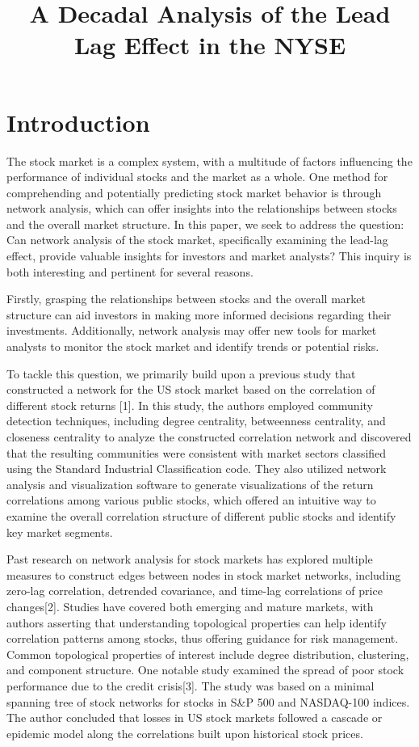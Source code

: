 \documentclass{article}
\title{A Decadal Analysis of the Lead Lag Effect in the NYSE}
\begin{document}
\maketitle




\section{Introduction}



The stock market is a complex system, with a multitude of factors influencing the performance of individual stocks and the market as a whole. One method for comprehending and potentially predicting stock market behavior is through network analysis, which can offer insights into the relationships between stocks and the overall market structure. In this paper, we seek to address the question: Can network analysis of the stock market, specifically examining the lead-lag effect, provide valuable insights for investors and market analysts? This inquiry is both interesting and pertinent for several reasons.

Firstly, grasping the relationships between stocks and the overall market structure can aid investors in making more informed decisions regarding their investments. Additionally, network analysis may offer new tools for market analysts to monitor the stock market and identify trends or potential risks.

To tackle this question, we primarily build upon a previous study that constructed a network for the US stock market based on the correlation of different stock returns [1]. In this study, the authors employed community detection techniques, including degree centrality, betweenness centrality, and closeness centrality to analyze the constructed correlation network and discovered that the resulting communities were consistent with market sectors classified using the Standard Industrial Classification  code. They also utilized network analysis and visualization software to generate visualizations of the return correlations among various public stocks, which offered an intuitive way to examine the overall correlation structure of different public stocks and identify key market segments.

Past research on network analysis for stock markets has explored multiple measures to construct edges between nodes in stock market networks, including zero-lag correlation, detrended covariance, and time-lag correlations of price changes[2].  Studies have covered both emerging and mature markets, with authors asserting that understanding topological properties can help identify correlation patterns among stocks, thus offering guidance for risk management. Common topological properties of interest include degree distribution, clustering, and component structure. One notable study examined the spread of poor stock performance due to the credit crisis[3]. The study was based on a minimal spanning tree of stock networks for stocks in S\&P 500 and NASDAQ-100 indices. The author concluded that losses in US stock markets followed a cascade or epidemic model along the correlations built upon historical stock prices.
\end{document}
